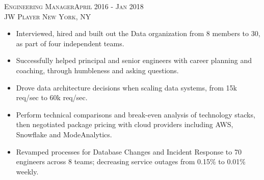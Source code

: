 \begin{comment}
  \textsc{Software Engineer \hfill February 2018 - October 2019\\}
  \textsc{Google \hfill New York, NY\\}
  \textsc{Tech-Lead of Android Advertising}
  \begin{itemize}
    \setlength{\itemsep}{1pt}
    \setlength{\parskip}{0pt}
    \setlength{\parsep}{0pt}
    \setlength{\leftmargin}{-5mm}
  \end{itemize}
\end{comment}

\textsc{Engineering Manager\hfill April 2016 - Jan 2018\\}
\textsc{JW Player \hfill New York, NY\\}
\begin{itemize}
	\setlength{\itemsep}{1pt}
	\setlength{\parskip}{0pt}
	\setlength{\parsep}{0pt}
	\setlength{\leftmargin}{-5mm}
	\item Interviewed, hired and built out the Data organization from 8 members to 30, as part of four independent teams.
	\item Successfully helped principal and senior engineers with career planning and coaching, through humbleness and asking questions.
	\item Drove data architecture decisions when scaling data systems, from 15k req/sec to 60k req/sec.
	\item Perform technical comparisons and break-even analysis of technology stacks, then negotiated package pricing with cloud providers including AWS, Snowflake and ModeAnalytics.
	\item Revamped processes for Database Changes and Incident Response to 70 engineers across 8 teams; decreasing service outages from 0.15\% to 0.01\% weekly.
\end{itemize}


